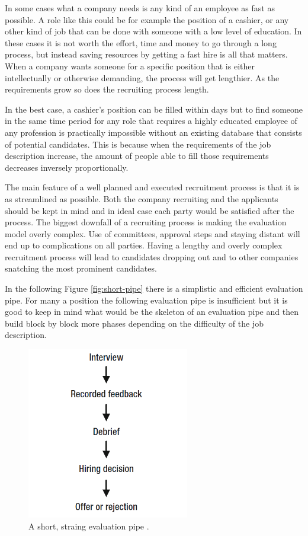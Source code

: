 \documentclass[11pt,a4paper,oneside,article]{memoir}
\begin{document}
In some cases what a company needs is any kind of an employee as fast as possible. A role like this could be for example the position of a cashier, or any other kind of job that can be done with someone with a low level of education. In these cases it is not worth the effort, time and money to go through a long process, but instead saving resources by getting a fast hire is all that matters. When a company wants someone for a specific position that is either intellectually or otherwise demanding, the process will get lengthier. As the requirements grow so does the recruiting process length.

In the best case, a cashier's position can be filled within days but to find someone in the same time period for any role that requires a highly educated employee of any profession is practically impossible without an existing database that consists of potential candidates. This is because when the requirements of the job description increase, the amount of people able to fill those requirements decreases inversely proportionally.

The main feature of a well planned and executed recruitment process is that it is as streamlined as possible. Both the company recruiting and the applicants should be kept in mind and in ideal case each party would be satisfied after the process. The biggest downfall of a recruiting process is making the evaluation model overly complex. Use of committees, approval steps and staying distant will end up to complications on all parties. Having a lengthy and overly complex recruitment process will lead to candidates dropping out and to other companies snatching the most prominent candidates. \cite[p.~42]{mcculler:book}

In the following Figure \vref{fig:short-pipe} there is a simplistic and efficient evaluation pipe. For many a position the following evaluation pipe is insufficient but it is good to keep in mind what would be the skeleton of an evaluation pipe and then build block by block more phases depending on the difficulty of the job description.

\begin{figure}[h]
  \centering
  \includegraphics[width=7.1cm]{short_pipe}
  \caption{A short, straing evaluation pipe \cite{mcculler:book}.}
  \label{fig:short-pipe}
\end{figure}
\end{document}
